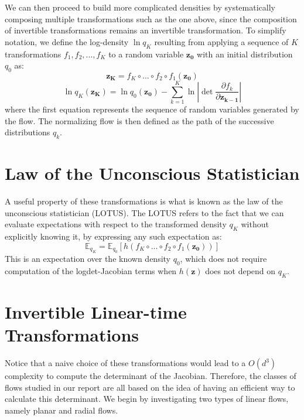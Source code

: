 We can then proceed to build more complicated densities by systematically composing multiple transformations such as the one above, since the composition of invertible transformations remains an invertible transformation. To simplify notation, we define the log-density $\ln q_K$ resulting from applying a sequence of $K$ transformations $f_1,f_2,...,f_K$ to a random variable $\mathbf{z_0}$ with an initial distribution $q_0$ as:
\begin{equation}
\mathbf{z_K} = f_K \circ ... \circ f_2 \circ f_1(\mathbf{z_0})
\end{equation}
\begin{equation}
\ln q_K(\mathbf{z_K}) = \ln q_0(\mathbf{z_0}) - \sum_{k=1}^{K} \ln \left| \det \frac{\partial f_k}{\partial \mathbf{z_{k-1}}} \right|
\end{equation}
where the first equation represents the sequence of random variables generated by the flow.  The normalizing flow is then defined as the path of the successive distributions $q_k$. 

\section{Law of the Unconscious Statistician}
A useful property of these transformations is what is known as the law of the unconscious statistician (LOTUS). The LOTUS refers to the fact that we can evaluate expectations with respect to the transformed density $q_K$ without explicitly knowing it, by expressing any such expectation as:
\begin{equation}
\mathbb{E}_{q_K} = \mathbb{E}_{q_0}[h(f_K \circ ... \circ f_2 \circ f_1(\mathbf{z_0}))]
\end{equation}
This is an expectation over the known density $q_0$, which does not require computation of the logdet-Jacobian terms when $h(\mathbf{z})$ does not depend on $q_K$.

\section{Invertible Linear-time Transformations}
Notice that a naive choice of these transformations would lead to a $O(d^3)$ complexity to compute the determinant of the Jacobian. Therefore, the classes of flows studied in our report are all based on the idea of having an efficient way to calculate this determinant. We begin by investigating two types of linear flows, namely planar and radial flows. 

